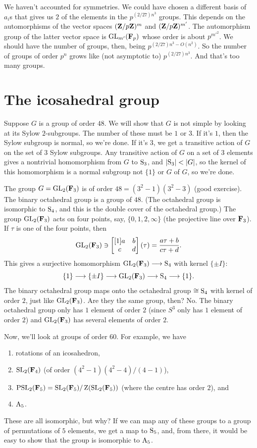 \documentclass[11pt, oneside]{amsart}
\begin{document}
We haven't accounted for symmetries. We could have chosen a different basis of $a_i$s that gives us $2$ of the elements in the $p^{(2/27) n^3}$ groups. This depends on the automorphisms of the vector spaces $(\mathbf Z / p\mathbf Z)^m$ and $(\mathbf Z / p\mathbf Z)^{m'}$. The automorphism group of the latter vector space is $\operatorname{GL}_{m'}(\mathbf F_p)$ whose order is about $p^{m'^2}$. We should have the number of groups, then, being $p^{(2/27) n^3 - O(n^2)}$. So the number of groups of order $p^n$ grows like (not asymptotic to) $p^{(2/27) n^3}$. And that's too many groups.

\section{The icosahedral group}
Suppose $G$ is a group of order $48$. We will show that $G$ is not simple by looking at its Sylow $2$-subgroups. The number of these must be $1$ or $3$. If it's $1$, then the Sylow subgroup is normal, so we're done. If it's $3$, we get a transitive action of $G$ on the set of $3$ Sylow subgroups. Any transitive action of $G$ on a set of $3$ elements gives a nontrivial homomorphism from $G$ to $\operatorname{S}_3$, and $\left \lvert \operatorname{S}_3 \right \rvert < \left \lvert G \right \rvert$, so the kernel of this homomorphism is a normal subgroup not $\{1\}$ or $G$ of $G$, so we're done.

The group $G = \operatorname{GL}_2 (\mathbf F_3)$ is of order $48 = (3^2-1)(3^2-3)$ (good exercise). The binary octahedral group is a group of $48$. (The octahedral group is isomorphic to $\operatorname{S}_4$, and this is the double cover of the octahedral group.) The group $\operatorname{GL}_2(\mathbf F_3)$ acts on four points, say, $\{0,1,2,\infty\}$ (the projective line over $\mathbf F_3$). If $\tau$ is one of the four points, then 
$$
\operatorname{GL}_2(\mathbf F_3) \ni \begin{bmatrix} [1] a&b\\c&d\end{bmatrix} (\tau) = \frac{a\tau + b}{c\tau + d}.
$$
This gives a surjective homomorphism $\operatorname{GL}_2(\mathbf F_3) \longrightarrow \operatorname{S}_4$ with kernel $\{\pm I\}$:
$$
\{1 \} \longrightarrow \{\pm I\} \longrightarrow \operatorname{GL}_2(\mathbf F_3) \longrightarrow \operatorname{S}_4 \longrightarrow \{1\}.
$$
The binary octahedral group maps onto the octahedral group $\cong \operatorname{S}_4$ with kernel of order $2$, just like $\operatorname{GL}_2(\mathbf F_3)$. Are they the same group, then? No. The binary octahedral group only has $1$ element of order $2$ (since $S^3$ only has $1$ element of order $2$) and $\operatorname{GL}_2(\mathbf F_3)$ has several elements of order $2$.

Now, we'll look at groups of order $60$. For example, we have
\begin{enumerate}
\item rotations of an icosahedron,
\item $\operatorname{SL}_2(\mathbf F_4)$ (of order $(4^2-1)(4^2-4)/(4-1)$),
\item $\operatorname{PSL}_2(\mathbf F_5) = \operatorname{SL}_2(\mathbf F_5) / \operatorname{Z}(\operatorname{SL}_2(\mathbf F_5))$ (where the centre has order $2$), and
\item $\operatorname{A}_5$.
\end{enumerate}
These are all isomorphic, but why? If we can map any of these groups to a group of permutations of $5$ elements, we get a map to $\operatorname{S}_5$, and, from there, it would be easy to show that the group is isomorphic to $\operatorname{A}_5$. 
\end{document}
